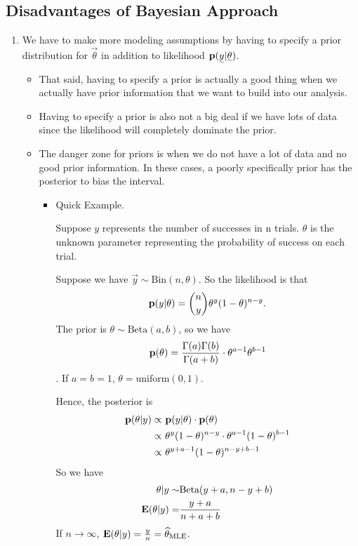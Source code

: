\subsection{Disadvantages of Bayesian Approach}
\begin{enumerate}
    \item We have to make more modeling assumptions by having to specify a prior distribution for $\vec{\theta}$ in addition to likelihood $\p(\vec{y}| \vec{\theta})$. 
    \begin{itemize}
        \item That said, having to specify a prior is actually a good thing when we actually have prior information that we want to build into our analysis.
        \item Having to specify a prior is also not a big deal if we have lots of data since the likelihood will completely dominate the prior.
        \item The danger zone for priors is when we do not have a lot of data and no good prior information. In these cases, a poorly specifically prior has the posterior to bias the interval.
        \begin{itemize}
            \item Quick Example.
            
            Suppose $y$ represents the number of successes in n trials. $\theta$ is the unknown parameter representing the probability of success on each trial. 
            
            Suppose we have $\vec{y} \sim \text{Bin}(n, \theta)$. So the likelihood is that 
            \[
                {\mathbf p}(y|\theta) = \binom{n}{y}\theta^y(1-\theta)^{n-y}.
            \]
            The prior is $\theta \sim \text{Beta}(a, b)$,  so we have 
            \[
                {\mathbf p}(\theta) = \frac{\Gamma(a) \Gamma(b)}{\Gamma(a+b)} \cdot \theta^{a-1} \theta^{b-1}
            \]. 
            If $a=b=1$, $\theta = \text{uniform}(0, 1)$.
            
            Hence, the posterior is 
            \begin{align*}
                {\mathbf p}(\theta|y) 
                \propto& ~{\mathbf p}(y| \theta) \cdot {\mathbf p}(\theta)\\
                \propto& ~\theta^y(1-\theta)^{n-y} \cdot \theta^{a-1} (1 - \theta)^{b-1}\\
                \propto& ~\theta^{y+a-1} (1-\theta)^{n-y+b-1}
            \end{align*}
            So we have
            \begin{align*}
                \theta| y \sim& \text{Beta}(y+a, n-y+b)\\
                {\mathbf E}(\theta| y) =& \frac{y+a}{n+a+b}
            \end{align*}
            If $n \rightarrow \infty$, ${\mathbf E}(\theta| y) = \frac{y}{n} = \widehat{\theta}_{\text{MLE}}$.
            

\end{itemize}
\end{itemize}
\end{enumerate}

